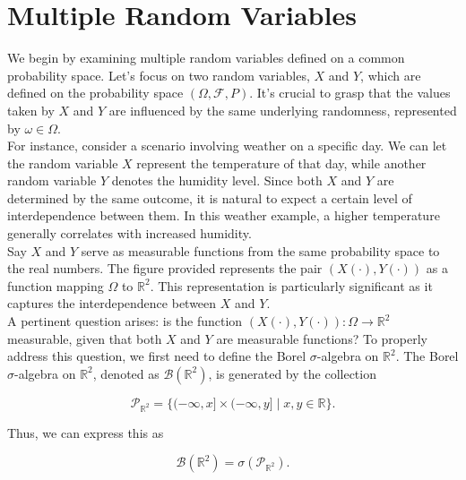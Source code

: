 \section{Multiple Random Variables}

We begin by examining multiple random variables defined on a common probability space. Let's focus on two random variables, \(X\) and \(Y\), which are defined on the probability space \((\Omega, \mathcal{F}, P)\). It's crucial to grasp that the values taken by \(X\) and \(Y\) are influenced by the same underlying randomness, represented by \(\omega \in \Omega\).\\

For instance, consider a scenario involving weather on a specific day. We can let the random variable \(X\) represent the temperature of that day, while another random variable \(Y\) denotes the humidity level. Since both \(X\) and \(Y\) are determined by the same outcome, it is natural to expect a certain level of interdependence between them. In this weather example, a higher temperature generally correlates with increased humidity.\\

Say \(X\) and \(Y\) serve as measurable functions from the same probability space to the real numbers. The figure provided represents the pair \((X(\cdot), Y(\cdot))\) as a function mapping \(\Omega\) to \(\mathbb{R}^2\). This representation is particularly significant as it captures the interdependence between \(X\) and \(Y\).\\

A pertinent question arises: is the function \((X(\cdot), Y(\cdot)) : \Omega \to \mathbb{R}^2\) measurable, given that both \(X\) and \(Y\) are measurable functions? To properly address this question, we first need to define the Borel \(\sigma\)-algebra on \(\mathbb{R}^2\). The Borel \(\sigma\)-algebra on \(\mathbb{R}^2\), denoted as \(\mathcal{B}(\mathbb{R}^2)\), is generated by the collection 

\[
\mathcal{P}_{\mathbb{R}^2} = \{ (-\infty, x] \times (-\infty, y] \mid x, y \in \mathbb{R} \}.
\]

Thus, we can express this as 

\[
\mathcal{B}(\mathbb{R}^2) = \sigma(\mathcal{P}_{\mathbb{R}^2}).
\]


